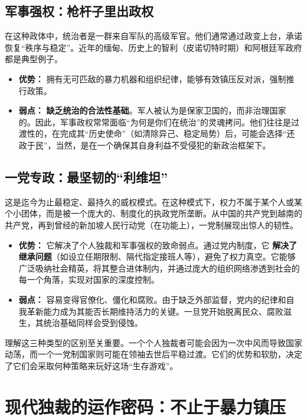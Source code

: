 \documentclass[a5paper, 11pt, openany]{ctexbook}
\begin{document}
\subsection{军事强权：枪杆子里出政权}

在这种政体中，统治者是一群来自军队的高级军官。他们通常通过政变上台，承诺恢复“秩序与稳定”。近年的缅甸、历史上的智利（皮诺切特时期）和阿根廷军政府都是典型例子。
\begin{itemize}
    \item \textbf{优势：} 拥有无可匹敌的暴力机器和组织纪律，能够有效镇压反对派，强制推行政策。
    \item \textbf{弱点：} \textbf{缺乏统治的合法性基础}。军人被认为是保家卫国的，而非治理国家的。因此，军事政权常常面临“为何是你们在统治”的灵魂拷问。他们往往是过渡性的，在完成其“历史使命”（如清除异己、稳定局势）后，可能会选择“还政于民”，当然，是在一个确保其自身利益不受侵犯的新政治框架下。
\end{itemize}

\subsection{一党专政：最坚韧的“利维坦”}

这是迄今为止最稳定、最持久的威权模式。在这种模式下，权力不属于某个人或某个小团体，而是被一个庞大的、制度化的执政党所垄断。从中国的共产党到越南的共产党，再到曾经的新加坡人民行动党（在功能上），一党制展现出惊人的韧性。
\begin{itemize}
    \item \textbf{优势：} 它解决了个人独裁和军事强权的致命弱点。通过党内制度，它 \textbf{解决了继承问题}（如设立任期限制、隔代指定接班人等），避免了权力真空。它能够广泛吸纳社会精英，将其整合进体制内，并通过庞大的组织网络渗透到社会的每一个角落，实现对国家的深度控制。
    \item \textbf{弱点：} 容易变得官僚化、僵化和腐败。由于缺乏外部监督，党内的纪律和自我革新能力成为其能否长期维持活力的关键。一旦党开始脱离民众、腐败滋生，其统治基础同样会受到侵蚀。
\end{itemize}

理解这三种类型的区别至关重要。一个个人独裁者可能会因为一次中风而导致国家动荡，而一个一党制国家则可能在领袖去世后平稳过渡。它们的优势和软肋，决定了它们会采取何种策略来玩好这场“生存游戏”。

\section{现代独裁的运作密码：不止于暴力镇压}
\end{document}
